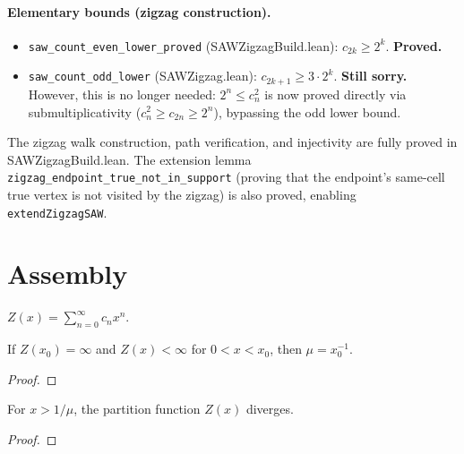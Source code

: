 \paragraph{Elementary bounds (zigzag construction).}
\begin{itemize}
  \item \texttt{saw\_count\_even\_lower\_proved} (SAWZigzagBuild.lean): $c_{2k} \geq 2^k$.
    \textbf{Proved.}
  \item \texttt{saw\_count\_odd\_lower} (SAWZigzag.lean): $c_{2k+1} \geq 3 \cdot 2^k$.
    \textbf{Still sorry.} However, this is no longer needed:
    $2^n \leq c_n^2$ is now proved directly via submultiplicativity
    ($c_n^2 \geq c_{2n} \geq 2^n$), bypassing the odd lower bound.
\end{itemize}
The zigzag walk construction, path verification, and injectivity
are fully proved in SAWZigzagBuild.lean. The extension lemma
\texttt{zigzag\_endpoint\_true\_not\_in\_support} (proving that
the endpoint's same-cell true vertex is not visited by the zigzag)
is also proved, enabling \texttt{extendZigzagSAW}.

\section{Assembly}

\begin{definition}\label{def:Z}
\leanok
{}
  $Z(x) = \sum_{n=0}^\infty c_n x^n$.
\end{definition}

\begin{theorem}\label{thm:partition_char}
\leanok
{}
  If $Z(x_0) = \infty$ and $Z(x) < \infty$ for $0 < x < x_0$, then $\mu = x_0^{-1}$.
\end{theorem}
\begin{proof}
\leanok
\end{proof}

\begin{theorem}\label{thm:partition_diverges}
\leanok
{}
  For $x > 1/\mu$, the partition function $Z(x)$ diverges.
\end{theorem}
\begin{proof}
\leanok
\end{proof}

